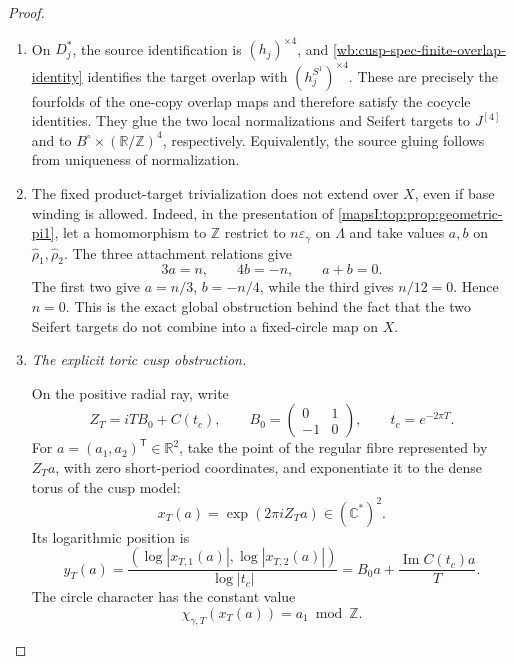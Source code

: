 \begin{proof}
\begin{enumerate}[label=\arabic*.,leftmargin=*]
\item On \(D_j^*\), the source identification is \((h_j)^{\times4}\), and
\cref{wb:cusp-spec-finite-overlap-identity} identifies the target overlap
with \((h_j^{S^1})^{\times4}\).  These are precisely the fourfolds of
the one-copy overlap maps and therefore satisfy the cocycle identities.
They glue the two local normalizations and Seifert targets to
\(J^{[4]}\) and to
\(B^\circ\times(\mathbb R/\mathbb Z)^4\), respectively.  Equivalently,
the source gluing follows from uniqueness of normalization.

\item The fixed product-target trivialization does not extend over \(X\), even if
base winding is allowed.  Indeed, in the presentation of
\cref{mapsI:top:prop:geometric-pi1}, let a homomorphism to \(\mathbb Z\) restrict to
\(n\varepsilon_\gamma\) on \(\Lambda\) and take values \(a,b\) on
\(\widehat\rho_1,\widehat\rho_2\).  The three attachment relations give
\[
 3a=n,\qquad4b=-n,\qquad a+b=0.
\]
The first two give \(a=n/3\), \(b=-n/4\), while the third gives
\(n/12=0\).  Hence \(n=0\).  This is the exact global obstruction behind
the fact that the two Seifert targets do not combine into a fixed-circle
map on \(X\).

\item \medskip\noindent\emph{The explicit toric cusp obstruction.}\par
On the positive radial ray, write
\[
 Z_T=iTB_0+C(t_c),\qquad
 B_0=\begin{pmatrix}0&1\\-1&0\end{pmatrix},\qquad
 t_c=e^{-2\pi T}.
\]
For \(a=(a_1,a_2)^{\mathsf T}\in\mathbb R^2\), take the point of the
regular fibre represented by \(Z_Ta\), with zero short-period coordinates,
and exponentiate it to the dense torus of the cusp model:
\[
 x_T(a)=\exp(2\pi iZ_Ta)\in(\mathbb C^*)^2.
\]
Its logarithmic position is
\begin{equation}
 y_T(a)=
 \frac{(\log|x_{T,1}(a)|,\log|x_{T,2}(a)|)}{\log|t_c|}
 =B_0a+\frac{\operatorname{Im}C(t_c)a}{T}.
 \label{wb:cusp-spec-cusp-nonextension-position}
\end{equation}
The circle character has the constant value
\begin{equation}
 \chi_{\gamma,T}(x_T(a))=a_1\bmod\mathbb Z.
 \label{wb:cusp-spec-cusp-nonextension-character}
\end{equation}


\end{enumerate}
\end{proof}
